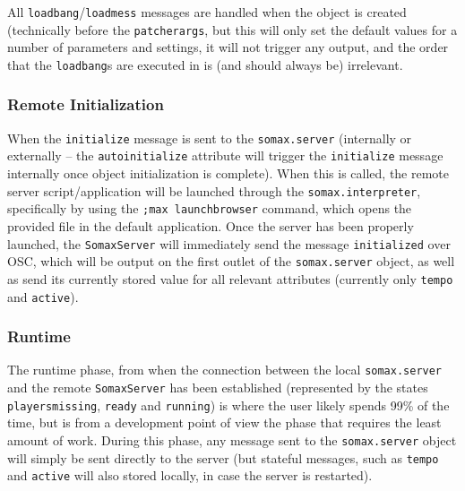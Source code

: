 All \texttt{loadbang}/\texttt{loadmess} messages are handled when the object is created (technically before the \texttt{patcherargs}, but this will only set the default values for a number of parameters and settings, it will not trigger any output, and the order that the \texttt{loadbang}s are executed in is (and should always be) irrelevant.


\subsubsection{Remote Initialization}
When the \texttt{initialize} message is sent to the \texttt{somax.server} (internally or externally – the \texttt{autoinitialize} attribute will trigger the \texttt{initialize} message internally once object initialization is complete). When this is called, the remote server script/application will be launched through the \texttt{somax.interpreter}, specifically by using the \texttt{;max launchbrowser} command, which opens the provided file in the default application. Once the server has been properly launched, the \texttt{SomaxServer} will immediately send the message \texttt{initialized} over OSC, which will be output on the first outlet of the \texttt{somax.server} object, as well as send its currently stored value for all relevant attributes (currently only \texttt{tempo} and \texttt{active}).


\subsubsection{Runtime}
The runtime phase, from when the connection between the local \texttt{somax.server} and the remote \texttt{SomaxServer} has been established (represented by the states \texttt{playersmissing}, \texttt{ready} and \texttt{running}) is where the user likely spends 99\% of the time, but is from a development point of view the phase that requires the least amount of work. During this phase, any message sent to the \texttt{somax.server} object will simply be sent directly to the server (but stateful messages, such as \texttt{tempo} and \texttt{active} will also stored locally, in case the server is restarted).


